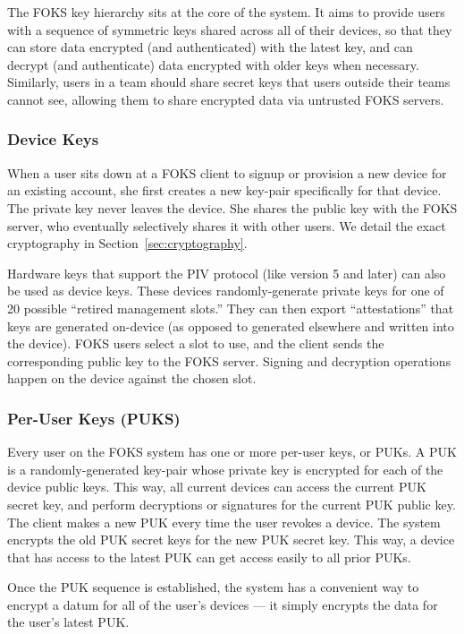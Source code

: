 The FOKS key hierarchy sits at the core of the system. It aims to provide users
with a sequence of symmetric keys shared across all of their devices, so that
they can store data encrypted (and authenticated) with the latest key, and can decrypt (and
authenticate) data encrypted with older keys when necessary. Similarly, users in
a team should share secret keys that users outside their teams cannot see, allowing
them to share encrypted data via untrusted FOKS servers.

\subsubsection{Device Keys}

When a user sits down at a FOKS client to signup or provision a new device
for an existing account, she first creates a new key-pair specifically
for that device. The private key never leaves the device. She shares the public key
with the FOKS server, who eventually selectively shares it with other users.
We detail the exact cryptography in Section~\ref{sec:cryptography}.

Hardware keys that support the PIV protocol (like \yubi{} version 5 and later)
can also be used as device keys. These devices randomly-generate private keys
for one of 20 possible ``retired management slots.'' They can then
export ``attestations'' that keys are generated on-device (as opposed to generated
elsewhere and written into the device). FOKS users select a slot to use, and the
client sends the corresponding public key to the FOKS server. Signing and
decryption operations happen on the device against the chosen slot. 

\subsubsection{Per-User Keys (PUKS)}

Every user on the FOKS system has one or more per-user keys, or PUKs. A PUK
is a randomly-generated key-pair whose private key is encrypted for each of
the device public keys. This way, all current devices can access the current
PUK secret key, and perform decryptions or signatures for the current PUK public
key. The client makes a new PUK every time the user revokes a device. The system
encrypts the old PUK secret keys for the new PUK secret key. This way,
a device that has access to the latest PUK can get access easily to all prior
PUKs.

Once the PUK sequence is established, the system has a convenient way to encrypt
a datum for all of the user's devices --- it simply encrypts the data for the 
user's latest PUK.

